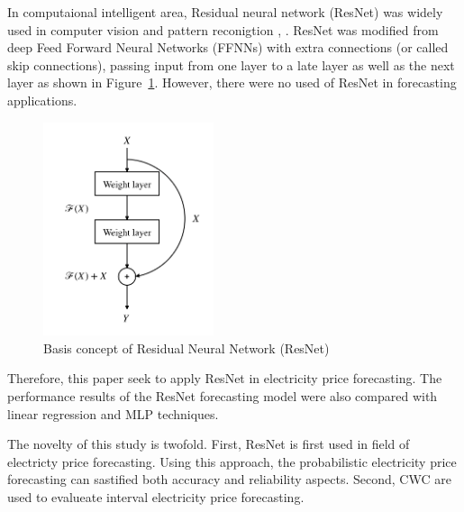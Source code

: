\documentclass[review]{elsarticle}
\begin{document}
    In computaional intelligent area, Residual neural network (ResNet) was widely used in computer vision and pattern reconigtion \cite{DBLP:journals/corr/HeZRS15}, \cite{DBLP:journals/corr/ZagoruykoK16}.
    ResNet was modified from deep Feed Forward Neural Networks (FFNNs) with extra connections (or called skip connections), passing input from one layer to a late layer as well as the next layer as shown in Figure~\ref{Fig:Basic_DRNN}.
    However, there were no used of ResNet in forecasting applications.

    \begin{figure}[H]
      \centering
      \includegraphics[width=5cm]{basic_DRNN}
      \caption{Basis concept of Residual Neural Network (ResNet)}
      \label{Fig:Basic_DRNN}
    \end{figure}


    Therefore, this paper seek to apply ResNet in electricity price forecasting.
    The performance results of the ResNet forecasting model were also compared with linear regression and MLP techniques.

    The novelty of this study is twofold.
    First, ResNet is first used in field of electricty price forecasting. Using this approach, the probabilistic electricity price forecasting can sastified both accuracy and reliability aspects.
    Second, CWC are used to evalueate interval electricity price forecasting.
\end{document}
